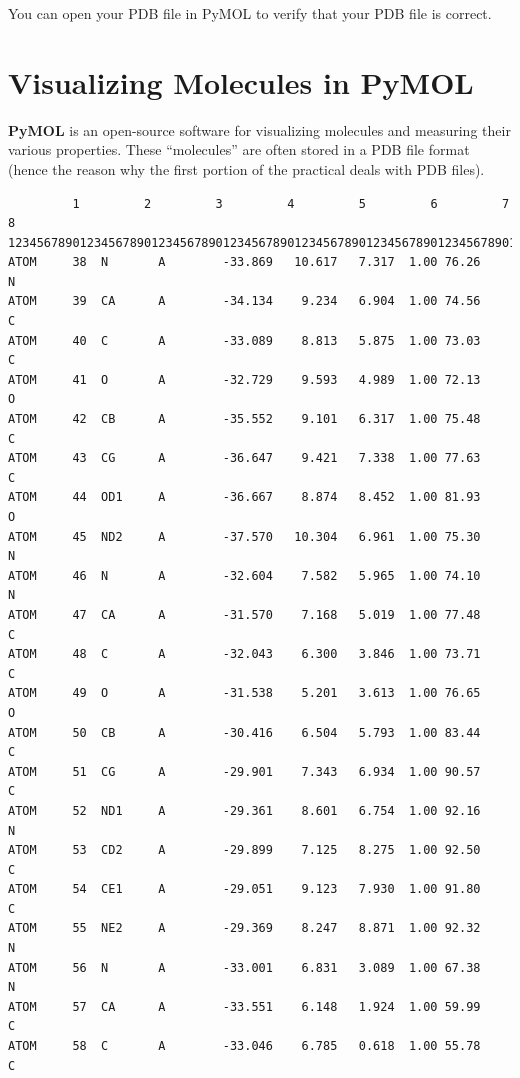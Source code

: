 \documentclass[
  letterpaper,
  DIV=11,
  numbers=noendperiod]{scrreprt}
\begin{document}
You can open your PDB file in PyMOL to verify that your PDB file is
correct.

\hypertarget{visualizing-molecules-in-pymol}{%
\section{Visualizing Molecules in
PyMOL}\label{visualizing-molecules-in-pymol}}

\textbf{PyMOL} is an open-source software for visualizing molecules and
measuring their various properties. These ``molecules'' are often stored
in a PDB file format (hence the reason why the first portion of the
practical deals with PDB files).

\begin{verbatim}
         1         2         3         4         5         6         7         8
12345678901234567890123456789012345678901234567890123456789012345678901234567890
ATOM     38  N       A        -33.869   10.617   7.317  1.00 76.26           N
ATOM     39  CA      A        -34.134    9.234   6.904  1.00 74.56           C
ATOM     40  C       A        -33.089    8.813   5.875  1.00 73.03           C
ATOM     41  O       A        -32.729    9.593   4.989  1.00 72.13           O
ATOM     42  CB      A        -35.552    9.101   6.317  1.00 75.48           C
ATOM     43  CG      A        -36.647    9.421   7.338  1.00 77.63           C
ATOM     44  OD1     A        -36.667    8.874   8.452  1.00 81.93           O
ATOM     45  ND2     A        -37.570   10.304   6.961  1.00 75.30           N
ATOM     46  N       A        -32.604    7.582   5.965  1.00 74.10           N
ATOM     47  CA      A        -31.570    7.168   5.019  1.00 77.48           C
ATOM     48  C       A        -32.043    6.300   3.846  1.00 73.71           C
ATOM     49  O       A        -31.538    5.201   3.613  1.00 76.65           O
ATOM     50  CB      A        -30.416    6.504   5.793  1.00 83.44           C
ATOM     51  CG      A        -29.901    7.343   6.934  1.00 90.57           C
ATOM     52  ND1     A        -29.361    8.601   6.754  1.00 92.16           N
ATOM     53  CD2     A        -29.899    7.125   8.275  1.00 92.50           C
ATOM     54  CE1     A        -29.051    9.123   7.930  1.00 91.80           C
ATOM     55  NE2     A        -29.369    8.247   8.871  1.00 92.32           N
ATOM     56  N       A        -33.001    6.831   3.089  1.00 67.38           N
ATOM     57  CA      A        -33.551    6.148   1.924  1.00 59.99           C
ATOM     58  C       A        -33.046    6.785   0.618  1.00 55.78           C

\end{verbatim}
\end{document}

